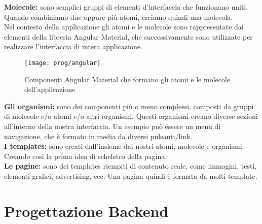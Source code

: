 \textbf{Molecole:} sono semplici gruppi di elementi d'interfaccia che funzionano uniti. Quando combiniamo due oppure più atomi, creiamo quindi una molecola.
\\

Nel contesto della applicazione gli atomi e le molecole sono rappresentate dai elementi della libreria Angular Material, che successivamente sono utilizzate per realizzare l'interfaccia di intera applicazione.

\begin{figure}[!h] 
	\centering 
	\texttt{[image: prog/angular]} 
	\caption{Componenti Angular Material che formano gli atomi e le molecole dell'applicazione}
\end{figure} 

\textbf{Gli organismi:} sono dei componenti più o meno complessi, composti da gruppi di molecole e/o atomi e/o altri organismi. Questi organismi creano diverse sezioni all'interno della nostra interfaccia. Un esempio può essere un menu di navigazione, che è formato in media da diversi pulsanti/link. 
\\

\textbf{I templates:} sono creati dall'insieme dai nostri atomi, molecole e organismi. Creando così la prima idea di scheletro della pagina.
\\

\textbf{Le pagine:} sono dei templates riempiti di contenuto reale, come immagini, testi, elementi grafici, advertising, ecc. Una pagina quindi è formata da molti template. 
\newpage
\section{Progettazione Backend}

